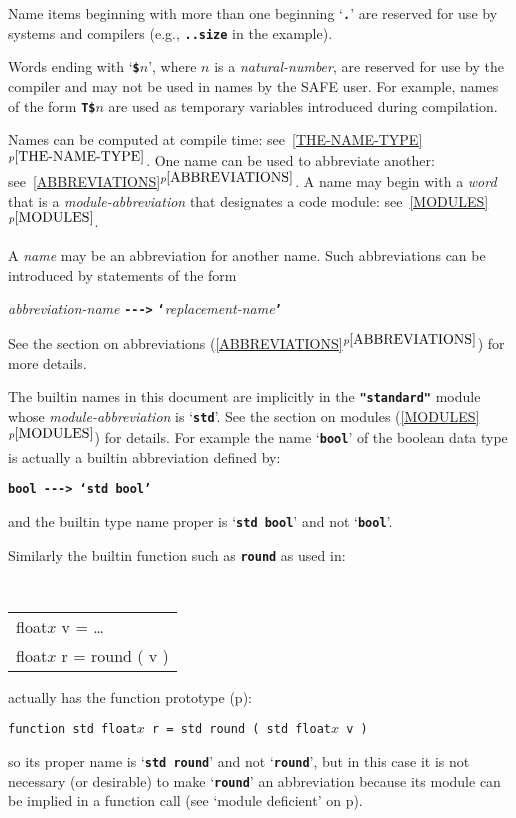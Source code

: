 \documentclass[12pt]{article}
\newcommand{\TT}[1]{{\tt \bfseries #1}}
\newcommand{\itemref}[1]{\ref{#1}$^{p\pageref{#1}}$}
\newcommand{\pagref}[1]{p\pageref{#1}}
\newcommand{\TMP}{\$}			%
\newcommand{\ABV}{-{}-{}->}		%
\begin{document}
Name items beginning with more than one beginning `\TT{.}' are reserved
for use by systems and compilers (e.g., \TT{..size} in the example).

Words ending with `\TT{\TMP$n$}', where $n$ is a {\em natural-number}, are
reserved for use by the compiler and may not be used in names by the
SAFE user.  For example, names of the form \TT{T\TMP$n$} are used as
temporary variables introduced during compilation.

Names can be computed at compile time:
see~\itemref{THE-NAME-TYPE}.
One name can be used to abbreviate another:
see~\itemref{ABBREVIATIONS}.
A name may begin with a {\em word} that is a {\em module-abbreviation}
that designates a code module: see~\itemref{MODULES}.

A {\em name} may be an abbreviation for another name.  Such abbreviations
can be introduced by statements of the form
\begin{center}
{\em abbreviation-name} \TT{\ABV} \TT{`}{\em replacement-name}\TT{'}
\end{center}
See the section on abbreviations
(\itemref{ABBREVIATIONS})
for more details.

The builtin names in this document are implicitly in the
\TT{"standard"} module whose {\em module-abbreviation} is `\TT{std}'.
See the section on modules (\itemref{MODULES}) for details.
For example the name `\TT{bool}' of the boolean data type is actually a builtin
abbreviation defined by:
\begin{center}
\TT{bool {\ABV} `std bool'}
\end{center}
and the builtin type name proper is `\TT{std bool}' and not `\TT{bool}'.


Similarly the  builtin function such as \TT{round} as used in:
\begin{center} \tt
\begin{tabular}{l}
float$x$ v = \ldots{} \\
float$x$ r = round ( v ) \\
\end{tabular}
\end{center}
actually has the function prototype (\pagref{FUNCTION-PROTOTYPE}):
\begin{center}
{\tt function std float$x$ r = std round ( std float$x$ v )} \\
\end{center}
so its proper name is `\TT{std round}' and not `\TT{round}',
but in this case it is not necessary (or desirable) to make `\TT{round}'
an abbreviation because its module can be implied in a function call
(see `module deficient' on \pagref{MODULE-DEFICIENT}).
\end{document}
